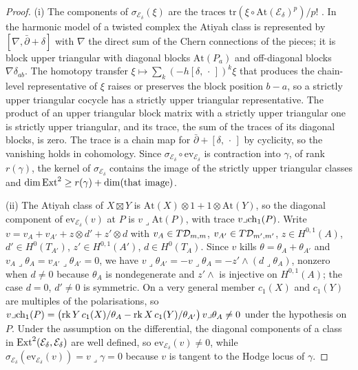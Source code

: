 \begin{proof}
(i) The components of $\sigma_{\mathcal{E}_{\delta}}(\xi)$ are the traces $\mathrm{tr}(\xi\circ\mathrm{At}(\mathcal{E}_{\delta})^{p})/p!$ \cite[Sect.~4]{BF03}. In the harmonic model of a twisted complex the Atiyah class is represented by $[\nabla,\bar\partial+\delta]$ with $\nabla$ the direct sum of the Chern connections of the pieces; it is block upper triangular with diagonal blocks $\mathrm{At}(P_{a})$ and off-diagonal blocks $\nabla\delta_{ab}$. The homotopy transfer $\xi\mapsto\sum_{k}(-h[\delta,\,\cdot\,])^{k}\xi$ that produces the chain-level representative of $\xi$ raises or preserves the block position $b-a$, so a strictly upper triangular cocycle has a strictly upper triangular representative. The product of an upper triangular block matrix with a strictly upper triangular one is strictly upper triangular, and its trace, the sum of the traces of its diagonal blocks, is zero. The trace is a chain map for $\bar\partial+[\delta,\,\cdot\,]$ by cyclicity, so the vanishing holds in cohomology. Since $\sigma_{\mathcal{E}_{\delta}}\circ\mathrm{ev}_{\mathcal{E}_{\delta}}$ is contraction into $\gamma$, of rank $r(\gamma)$, the kernel of $\sigma_{\mathcal{E}_{\delta}}$ contains the image of the strictly upper triangular classes and $\dim\mathrm{Ext}^{2}\ge r(\gamma)+\dim(\text{that image})$.

(ii) The Atiyah class of $X\boxtimes Y$ is $\mathrm{At}(X)\otimes1+1\otimes\mathrm{At}(Y)$, so the diagonal component of $\mathrm{ev}_{\mathcal{E}_{\delta}}(v)$ at $P$ is $v\lrcorner\mathrm{At}(P)$, with trace $v\lrcorner\mathrm{ch}_{1}(P)$. Write $v=v_{A}+v_{A'}+z\otimes d'+z'\otimes d$ with $v_{A}\in T\mathcal{D}_{m,m}$, $v_{A'}\in T\mathcal{D}_{m',m'}$, $z\in H^{0,1}(A)$, $d'\in H^{0}(T_{A'})$, $z'\in H^{0,1}(A')$, $d\in H^{0}(T_{A})$. Since $v$ kills $\theta=\theta_{A}+\theta_{A'}$ and $v_{A}\lrcorner\theta_{A}=v_{A'}\lrcorner\theta_{A'}=0$, we have $v\lrcorner\theta_{A'}=-v\lrcorner\theta_{A}=-z'\wedge(d\lrcorner\theta_{A})$, nonzero when $d\ne0$ because $\theta_{A}$ is nondegenerate and $z'\wedge$ is injective on $H^{0,1}(A)$; the case $d=0$, $d'\ne0$ is symmetric. On a very general member $c_{1}(X)$ and $c_{1}(Y)$ are multiples of the polarisations, so $v\lrcorner\mathrm{ch}_{1}(P)=\bigl(\operatorname{rk}Y\,c_{1}(X)/\theta_{A}-\operatorname{rk}X\,c_{1}(Y)/\theta_{A'}\bigr)\,v\lrcorner\theta_{A}\ne0$ under the hypothesis on $P$. Under the assumption on the differential, the diagonal components of a class in $\mathrm{Ext}^{2}(\mathcal{E}_{\delta},\mathcal{E}_{\delta})$ are well defined, so $\mathrm{ev}_{\mathcal{E}_{\delta}}(v)\ne0$, while $\sigma_{\mathcal{E}_{\delta}}(\mathrm{ev}_{\mathcal{E}_{\delta}}(v))=v\lrcorner\gamma=0$ because $v$ is tangent to the Hodge locus of $\gamma$.


\end{proof}
